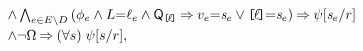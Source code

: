 \begin{minipage}{1.0\linewidth}
\begin{multicols}{2}
\begin{enumerate}[topsep=0pt,label=(\textsc{r}\arabic*),ref=\textsc{r}\arabic*]
\begin{math}
\begin{aligned}[t]
          \land
          &\textstyle\bigwedge_{e\in E\setminus D}
          {
            (
              \phi_e
              \land L{=}\ell_e
              \land \mathsf{Q}_{\mkern-0mu\texttt{[}\mkern-2mu\ell \mkern-2mu\texttt{]}\mkern-0mu}
              \mathbin{\Rightarrow}
              v_e{=}\mathit{s}_{e}
              \lor
              \mkern-0mu\texttt{[}\mkern-2mu\ell \mkern-2mu\texttt{]}\mkern-0mu{=}\mathit{s}_{e}
            )
            \mathbin{\Rightarrow}
            \psi[\mathit{s}_{e}/r]
          }
          \\[-.5ex]
          \land
          &
          \lnot\Omega
          \mathbin{\Rightarrow} 
          (\forall s)\;
          \psi[s/r],
        \end{aligned}
      \end{math}

\end{enumerate}
\end{multicols}
\end{minipage}
